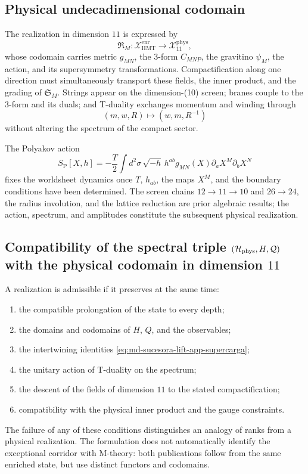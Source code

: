 \subsection{Physical undecadimensional codomain}

The realization in dimension \(11\) is expressed by
\[
 \mathfrak R_M:\mathcal X_{\mathrm{HMT}}^{\mathrm{enr}}
 \longrightarrow
 \mathcal X_{11}^{\mathrm{phys}},
\]
whose codomain carries metric \(g_{MN}\), the \(3\)-form \(C_{MNP}\), the
gravitino \(\psi_M\), the action, and its supersymmetry transformations.
Compactification along one direction must simultaneously transport these
fields, the inner product, and the grading of \(\mathfrak S_M\). Strings
appear on the dimension-(10) screen; branes couple to the
\(3\)-form and its duals; and T-duality exchanges momentum and
winding through
\[
 (m,w,R)\longmapsto(w,m,R^{-1})
\]
without altering the spectrum of the compact sector.

The Polyakov action
\[
 S_{\mathrm P}[X,h]
 =-\frac{T}{2}\int d^2\sigma\,
 \sqrt{-h}\,h^{ab}g_{MN}(X)
 \partial_aX^M\partial_bX^N
\]
fixes the worldsheet dynamics once \(T\), \(h_{ab}\), the maps \(X^M\), and the boundary conditions have been determined. The screen chains \(12\to11\to10\) and \(26\to24\), the radius involution, and the lattice reduction are prior algebraic results; the action, spectrum, and amplitudes constitute the subsequent physical realization.

\subsection{Compatibility of the spectral triple \((\mathcal H_{\rm phys},H,\mathcal Q)\) with the physical codomain in dimension \(11\)}

A realization is admissible if it preserves at the same time:
\begin{enumerate}
 \item the compatible prolongation of the state to every depth;
 \item the domains and codomains of \(H\), \(Q\), and the observables;
 \item the intertwining identities
       \eqref{eq:md-sucesora-lift-app-supercarga};
 \item the unitary action of T-duality on the spectrum;
 \item the descent of the fields of dimension \(11\) to the stated
       compactification;
 \item compatibility with the physical inner product and the gauge
       constraints.
\end{enumerate}
The failure of any of these conditions distinguishes an analogy of ranks
from a physical realization. The formulation does not automatically identify the
exceptional corridor with M-theory: both publications follow from the same
enriched state, but use distinct functors and codomains.
